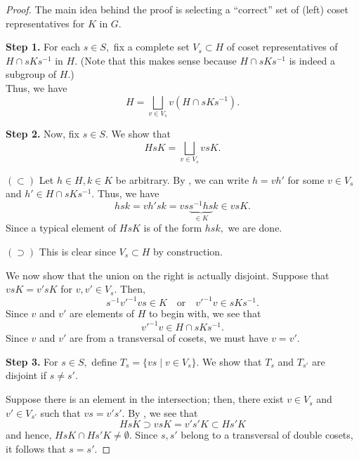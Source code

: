 \begin{proof} 
	The main idea behind the proof is selecting a ``correct'' set of (left) coset representatives for $K$ in $G.$ 

	\textbf{Step 1.} For each $s \in S,$ fix a complete set $V_s \subset H$ of coset representatives of $H \cap sKs^{-1}$ in $H.$ (Note that this makes sense because $H \cap sKs^{-1}$ is indeed a subgroup of $H.$)\\
	Thus, we have
	\begin{equation} \tag{$*$} \label{eq:007}
		H = \bigsqcup_{v \in V_s}v(H \cap sKs^{-1}).
	\end{equation}

	\textbf{Step 2.} Now, fix $s \in S.$ We show that
	\begin{equation} \tag{$**$} \label{eq:008}
		HsK = \bigsqcup_{v \in V_s}vsK.
	\end{equation}

	$(\subset)$ Let $h \in H, k \in K$ be arbitrary. By , we can write $h = vh'$ for some $v \in V_s$ and $h' \in H \cap sKs^{-1}.$ Thus, we have
	\begin{equation*} 
		hsk = vh'sk = vs\underbrace{s^{-1}hs}_{\in K}k \in vsK.
	\end{equation*}
	Since a typical element of $HsK$ is of the form $hsk,$ we are done.

	$(\supset)$ This is clear since $V_s \subset H$ by construction.

	We now show that the union on the right is actually disjoint. Suppose that $vsK = v'sK$ for $v, v' \in V_s.$ Then, 
	\begin{equation*} 
		s^{-1}v'^{-1}vs \in K \quad\text{or}\quad v'^{-1}v \in sKs^{-1}.
	\end{equation*}
	Since $v$ and $v'$ are elements of $H$ to begin with, we see that
	\begin{equation*} 
		v'^{-1}v \in H \cap sKs^{-1}.
	\end{equation*}
	Since $v$ and $v'$ are from a transversal of cosets, we must have $v = v'.$

	\textbf{Step 3.} For $s \in S,$ define $T_s = \{vs \mid v \in V_s\}.$ We show that $T_s$ and $T_{s'}$ are disjoint if $s \neq s'.$

	Suppose there is an element in the intersection; then, there exist $v \in V_s$ and $v' \in V_{s'}$ such that $vs = v's'.$ By , we see that
	\begin{equation*} 
		HsK \supset vsK = v's'K \subset Hs'K
	\end{equation*}
	and hence, $HsK \cap Hs'K \neq \emptyset.$ Since $s, s'$ belong to a transversal of double cosets, it follows that $s = s'.$


\end{proof}
